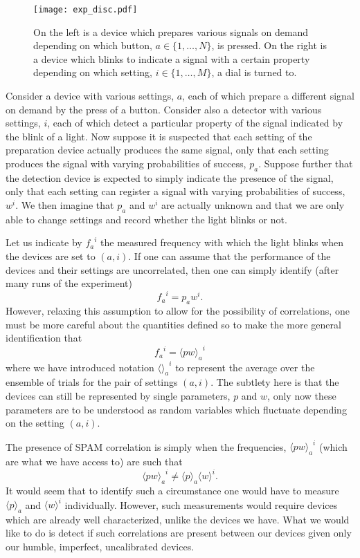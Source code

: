 \documentclass[pra, 10pt, notitlepage, twocolumn]{revtex4-1}
\begin{document}
\begin{figure}[h!]
\centering
\texttt{[image: exp\_disc.pdf]}
\caption{
On the left is a device which prepares various signals on demand depending on which button, $a\in\{1,\ldots,N\}$, is pressed.
On the right is a device which blinks to indicate a signal with a certain property depending on which setting, $i\in\{1,\ldots,M\}$, a dial is turned to.
}\label{knobs}
\end{figure}

Consider a device with various settings, $a$, each of which prepare a different signal on demand by the press of a button.
Consider also a detector with various settings, $i$, each of which detect a particular property of the signal indicated by the blink of a light.
Now suppose it is suspected that each setting of the preparation device actually produces the same signal,
only that each setting produces the signal with varying probabilities of success, $p_a$.
Suppose further that the detection device is expected to simply indicate the presence of the signal, only that each setting can register a signal with varying probabilities of success, $w^i$.
We then imagine that $p_a$ and $w^i$ are actually unknown and that we are only able to change settings and record whether the light blinks or not.

Let us indicate by ${f_a}^i$ the measured frequency with which the light blinks when the devices are set to $(a,i)$.
If one can assume that the performance of the devices and their settings are uncorrelated, then one can simply identify (after many runs of the experiment)
\begin{equation}
	{f_a}^i = p_a w^i.
\end{equation}
However, relaxing this assumption to allow for the possibility of correlations,
one must be more careful about the quantities defined so to make the more general identification that
\begin{equation}
	{f_a}^i = {\langle pw \rangle_a}^i
\end{equation}
where we have introduced notation ${\langle \rangle_a}^i$ to represent the average over the ensemble of trials for the pair of settings $(a,i)$.
The subtlety here is that the devices can still be represented by single parameters, $p$ and $w$,
only now these parameters are to be understood as random variables which fluctuate depending on the setting $(a,i)$.

The presence of SPAM correlation is simply when the frequencies, ${\langle pw \rangle_a}^i$ (which are what we have access to) are such that
\begin{equation}
	{\langle pw \rangle_a}^i \neq \langle p \rangle_a\langle w \rangle^i.
\end{equation}
It would seem that to identify such a circumstance one would have to measure $\langle p \rangle_a$ and $\langle w \rangle^i$ individually.
However, such measurements would require devices which are already well characterized, unlike the devices we have.
What we would like to do is detect if such correlations are present between our devices given only our humble, imperfect, uncalibrated devices.
\end{document}
